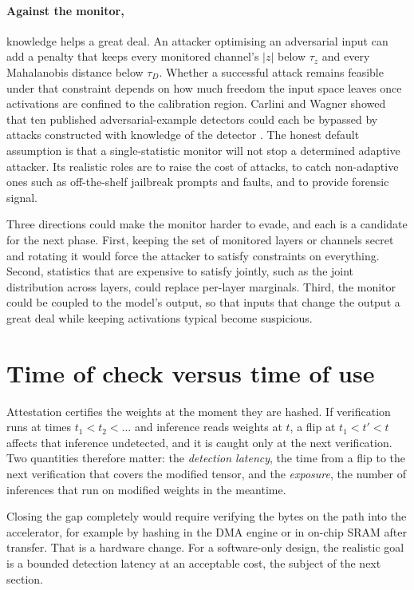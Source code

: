 \paragraph{Against the monitor,} knowledge helps a great deal. An attacker optimising an
adversarial input can add a penalty that keeps every monitored channel's $|z|$ below $\tau_z$ and
every Mahalanobis distance below $\tau_D$. Whether a successful attack remains feasible under that
constraint depends on how much freedom the input space leaves once activations are confined to the
calibration region. Carlini and Wagner showed that ten published adversarial-example detectors could
each be bypassed by attacks constructed with knowledge of the detector
\cite{carlini2017bypassing}. The honest default assumption is that a single-statistic monitor will not stop a determined adaptive
attacker. Its realistic roles are to raise the cost of attacks, to catch non-adaptive ones such as
off-the-shelf jailbreak prompts and faults, and to provide forensic signal.

Three directions could make the monitor harder to evade, and each is a candidate for the next
phase. First, keeping the set of monitored layers or channels secret and rotating it would force
the attacker to satisfy constraints on everything. Second, statistics that are expensive to
satisfy jointly, such as the joint distribution across layers, could replace per-layer marginals.
Third, the monitor could be coupled to the model's output, so that inputs that change the output a
great deal while keeping activations typical become suspicious.

\section{Time of check versus time of use}
\label{sec:disc:toctou}

Attestation certifies the weights at the moment they are hashed. If verification runs at times
$t_1<t_2<\dots$ and inference reads weights at $t$, a flip at $t_1<t'<t$ affects that inference
undetected, and it is caught only at the next verification. Two quantities therefore matter: the
\emph{detection latency}, the time from a flip to the next verification that covers the modified
tensor, and the \emph{exposure}, the number of inferences that run on modified weights in the
meantime.

Closing the gap completely would require verifying the bytes on the path into the accelerator,
for example by hashing in the DMA engine or in on-chip SRAM after transfer. That is a hardware
change. For a software-only design, the realistic goal is a bounded
detection latency at an acceptable cost, the subject of the next section.

